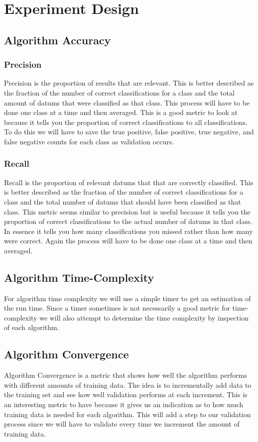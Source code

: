\documentclass{article}
\begin{document}
	\section{Experiment Design}
		\subsection{Algorithm Accuracy}
			\subsubsection{Precision}
			Precision is the proportion of results that are relevant\cite{ai}. This is better described as the fraction of the number of correct classifications for a class and the total amount of datums that were classified as that class. This process will have to be done one class at a time and then averaged.
			This is a good metric to look at because it tells you the proportion of correct classifications to all classifications. To do this we will have to save the true positive, false positive, true negative, and false negative counts for each class as validation occurs.
			\subsubsection{Recall}
			Recall is the proportion of relevant datums that that are correctly classified. This is better described as the fraction of the number of correct classifications for a class and the total number of datums that should have been classified as that class. This metric seems similar to precision but is useful because it tells you the proportion of correct classifications to the actual number of datums in that class. In essence it tells you how many classifications you missed rather than how many were correct. Again the process will have to be done one class at a time and then averaged. 
		\subsection{Algorithm Time-Complexity}
		For algorithm time complexity we will use a simple timer to get an estimation of the run time. Since a timer sometimes is not necessarily a good metric for time-complexity we will also attempt to determine the time complexity by inspection of each algorithm.
		\subsection{Algorithm Convergence}
			\label{convergence}
		Algorithm Convergence is a metric that shows how well the algorithm performs with different amounts of training data. The idea is to incrementally add data to the training set and see how well validation performs at each increment. This is an interesting metric to have because it gives us an indication as to how much training data is needed for each algorithm. This will add a step to our validation process since we will have to validate every time we increment the amount of training data.


		
	
\end{document}
